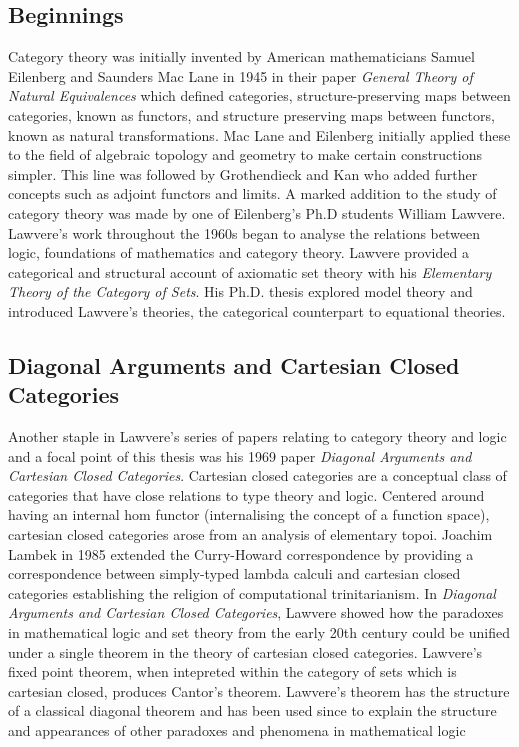 \subsection{Beginnings}
Category theory was initially invented by American mathematicians Samuel
Eilenberg and Saunders Mac Lane in 1945 in their paper \textit{General Theory of
Natural Equivalences} which defined categories, structure-preserving maps
between categories, known as functors, and structure preserving maps between
functors, known as natural transformations. Mac Lane and Eilenberg initially
applied these to the field of algebraic topology and geometry to make certain
constructions simpler.  This line was followed by Grothendieck and Kan who added
further concepts such as adjoint functors and limits. A marked addition to the
study of category theory was made by one of Eilenberg's Ph.D students William
Lawvere. Lawvere's work throughout the 1960s began to analyse the relations
between logic, foundations of mathematics and category theory. Lawvere provided
a categorical and structural account of axiomatic set theory with his
\textit{Elementary Theory of the Category of Sets}. His Ph.D. thesis explored
model theory and introduced Lawvere's theories, the categorical counterpart to
equational theories.

\subsection{Diagonal Arguments and Cartesian Closed Categories}
Another staple in Lawvere's series of papers relating to category theory and
logic and a focal point of this thesis was his 1969 paper \textit{Diagonal
Arguments and Cartesian Closed Categories}. Cartesian closed categories are
a conceptual class of categories that have close relations to type theory and
logic. Centered around having an internal hom functor (internalising the concept
of a function space), cartesian closed categories arose from an analysis of
elementary topoi. Joachim Lambek in 1985 extended the Curry-Howard
correspondence by providing a correspondence between simply-typed lambda calculi
and cartesian closed categories establishing the religion of computational
trinitarianism. In \textit{Diagonal Arguments and Cartesian Closed Categories},
Lawvere showed how the paradoxes in mathematical logic and set theory from the
early 20th century could be unified under a single theorem in the theory of
cartesian closed categories. Lawvere's fixed point theorem, when intepreted
within the category of sets which is cartesian closed, produces Cantor's
theorem. Lawvere's theorem has the structure of a classical diagonal theorem and
has been used since to explain the structure and appearances of other paradoxes
and phenomena in mathematical logic

